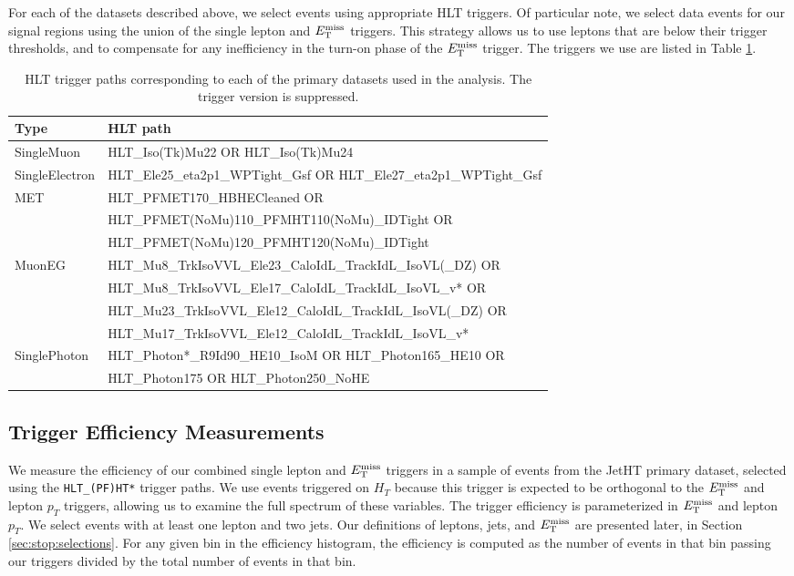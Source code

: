 For each of the datasets described above, we select events using
appropriate HLT triggers. Of particular note, we select data events
for our signal regions using the union of the single lepton and $E_\text{T}^\text{miss}$
triggers. This strategy allows us to use leptons that are below their
trigger thresholds, and to compensate for any inefficiency in the
turn-on phase of the $E_\text{T}^\text{miss}$ trigger. The triggers we use are
listed in Table \ref{tab:stop:trigs}.

\begin{table}[htb]
\caption{HLT trigger paths corresponding to each of the primary
  datasets used in the analysis. The trigger version is suppressed.}
\label{tab:stop:trigs}
\centering
\footnotesize
\begin{tabular}{|l|l|}
\hline
Type & HLT path \\
\hline
SingleMuon & HLT\_Iso(Tk)Mu22 OR HLT\_Iso(Tk)Mu24 \\
SingleElectron & HLT\_Ele25\_eta2p1\_WPTight\_Gsf OR HLT\_Ele27\_eta2p1\_WPTight\_Gsf \\
\hline
\multirow{3}{*}{MET} & HLT\_PFMET170\_HBHECleaned OR \\
 & HLT\_PFMET(NoMu)110\_PFMHT110(NoMu)\_IDTight OR \\
 & HLT\_PFMET(NoMu)120\_PFMHT120(NoMu)\_IDTight \\
\hline
\hline
\multirow{4}{*}{MuonEG} & HLT\_Mu8\_TrkIsoVVL\_Ele23\_CaloIdL\_TrackIdL\_IsoVL(\_DZ) OR \\
 & HLT\_Mu8\_TrkIsoVVL\_Ele17\_CaloIdL\_TrackIdL\_IsoVL\_v* OR \\
 & HLT\_Mu23\_TrkIsoVVL\_Ele12\_CaloIdL\_TrackIdL\_IsoVL(\_DZ) OR \\
 & HLT\_Mu17\_TrkIsoVVL\_Ele12\_CaloIdL\_TrackIdL\_IsoVL\_v* \\
\hline
\multirow{2}{*}{SinglePhoton} & HLT\_Photon*\_R9Id90\_HE10\_IsoM OR HLT\_Photon165\_HE10 OR \\
 & HLT\_Photon175 OR HLT\_Photon250\_NoHE \\
\hline
\end{tabular}
\end{table}

\subsection{Trigger Efficiency Measurements}
\label{ssec:stop:trigeff}

We measure the efficiency of our combined single lepton and $E_\text{T}^\text{miss}$
triggers in a sample of events from the JetHT primary dataset,
selected using the \verb+HLT_(PF)HT*+ trigger paths. We use events
triggered on $H_T$ because this trigger is expected to be orthogonal
to the $E_\text{T}^\text{miss}$ and lepton $p_T$ triggers, allowing us to examine the full
spectrum of these variables. The trigger
efficiency is parameterized in $E_\text{T}^\text{miss}$ and lepton $p_T$. We select events
with at least one lepton and two jets. Our definitions of leptons,
jets, and $E_\text{T}^\text{miss}$ are presented later, in Section
\ref{sec:stop:selections}. For any given bin in the efficiency
histogram, the efficiency is computed as the number of events in that
bin passing our triggers divided by the total number of events in that
bin.

